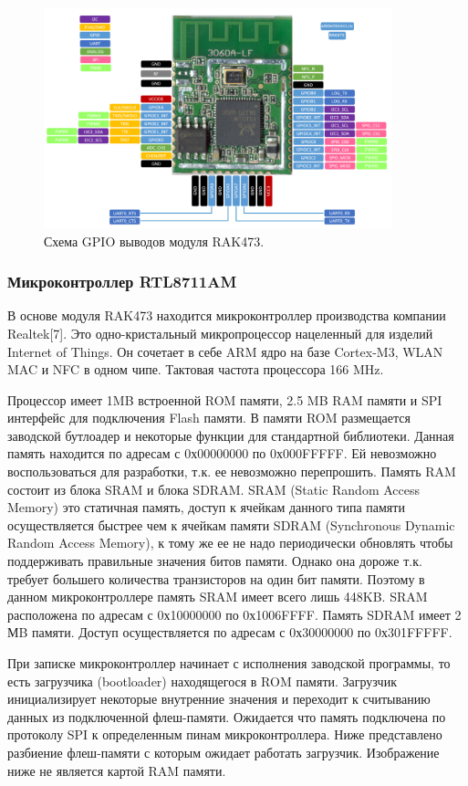 \begin{figure}[h!]
    \centering
    \includegraphics[width=0.9\textwidth]{rak473_pinout.png}
    \caption{Схема GPIO выводов модуля RAK473.}
\end{figure}

\subsubsection{ Микроконтроллер RTL8711AM}
В основе модуля RAK473 находится микроконтроллер производства компании Realtek[7]. Это одно-кристальный микропроцессор нацеленный для изделий Internet of Things. Он сочетает в себе ARM ядро на базе Cortex-M3, WLAN MAC и NFC в одном чипе. Тактовая частота процессора 166 MHz. 

Процессор имеет 1MB встроенной ROM памяти, 2.5 MB RAM памяти и SPI интерфейс для подключения Flash памяти.  В памяти ROM размещается заводской бутлоадер и некоторые функции для стандартной библиотеки. Данная память находится по адресам с 0х00000000 по 0х000FFFFF. Ей невозможно воспользоваться для разработки, т.к. ее невозможно перепрошить. Память RAM состоит из блока SRAM и блока SDRAM. SRAM (Static Random Access Memory) это статичная память, доступ к ячейкам данного типа памяти осуществляется быстрее чем к ячейкам памяти SDRAM (Synchronous Dynamic Random Access Memory), к тому же ее не надо периодически обновлять чтобы поддерживать правильные значения битов памяти. Однако она дороже т.к. требует большего количества транзисторов на один бит памяти. Поэтому в данном микроконтроллере память SRAM имеет всего лишь 448KB. SRAM расположена по адресам с 0х10000000 по 0х1006FFFF. Память SDRAM имеет 2 МB памяти. Доступ осуществляется по адресам с 0х30000000 по 0х301FFFFF.

При записке микроконтроллер начинает с исполнения заводской программы, то есть загрузчика (bootloader) находящегося в ROM памяти. Загрузчик инициализирует некоторые внутренние значения и переходит к считыванию данных из подключенной флеш-памяти. Ожидается что память подключена по протоколу SPI к определенным пинам микроконтроллера. 
Ниже представлено разбиение флеш-памяти с которым ожидает работать загрузчик. Изображение ниже не является картой RAM памяти. 

